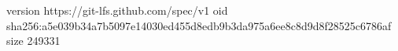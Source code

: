 version https://git-lfs.github.com/spec/v1
oid sha256:a5e039b34a7b5097e14030ed455d8edb9b3da975a6ee8c8d9d8f28525c6786af
size 249331
